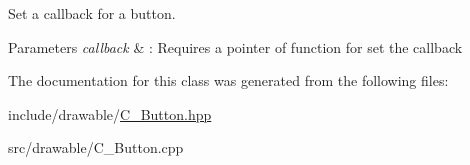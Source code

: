 Set a callback for a button. 


\begin{DoxyParams}{Parameters}
{\em callback} & \+: Requires a pointer of function for set the callback \\
\hline
\end{DoxyParams}


The documentation for this class was generated from the following files\+:\begin{DoxyCompactItemize}
\item 
include/drawable/\hyperlink{Button_8hpp}{C_Button.\+hpp}\item
src/drawable/C_Button.\+cpp\end{DoxyCompactItemize}
